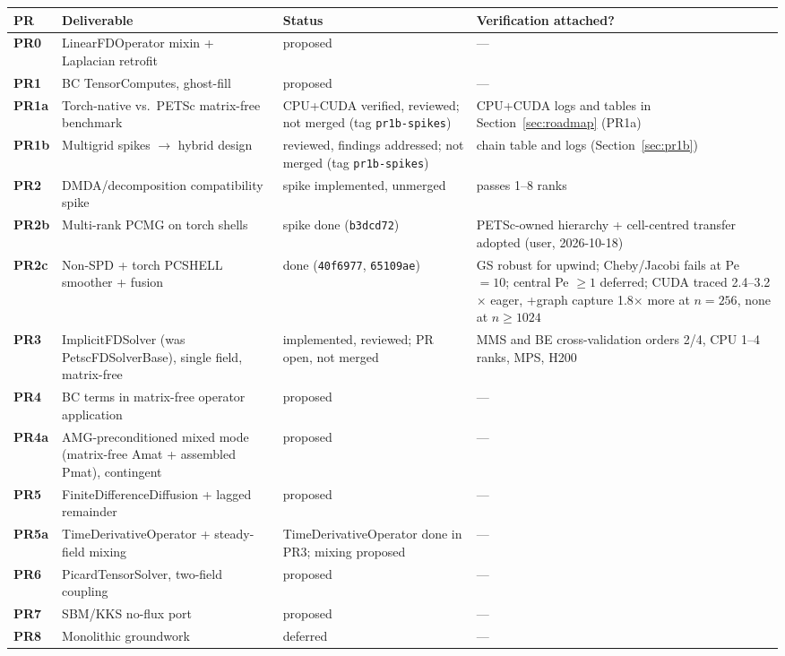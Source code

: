 \documentclass[11pt]{article}
\begin{document}
\begin{longtable}{>{\bfseries}p{} p{} p{} p{}}
\toprule
PR & Deliverable & Status & Verification attached? \\
\midrule
\endhead
PR0 & LinearFDOperator mixin + Laplacian retrofit & proposed & --- \\
PR1 & BC TensorComputes, ghost-fill & proposed & --- \\
PR1a & Torch-native vs.\ PETSc matrix-free benchmark & CPU+CUDA verified, reviewed; not merged (tag \texttt{pr1b-spikes}) & CPU+CUDA logs and tables in Section~\ref{sec:roadmap} (PR1a) \\
PR1b & Multigrid spikes $\to$ hybrid design & reviewed, findings addressed; not merged (tag \texttt{pr1b-spikes}) & chain table and logs (Section~\ref{sec:pr1b}) \\
PR2 & DMDA/decomposition compatibility spike & spike implemented, unmerged & passes 1--8 ranks \\
PR2b & Multi-rank PCMG on torch shells & spike done (\texttt{b3dcd72}) & PETSc-owned hierarchy + cell-centred transfer adopted (user, 2026-10-18) \\
PR2c & Non-SPD + torch PCSHELL smoother + fusion & done (\texttt{40f6977}, \texttt{65109ae}) & GS robust for upwind; Cheby/Jacobi fails at Pe $=10$; central Pe $\ge1$ deferred; CUDA traced 2.4--3.2$\times$ eager, +graph capture 1.8$\times$ more at $n=256$, none at $n\ge1024$ \\
PR3 & ImplicitFDSolver (was PetscFDSolverBase), single field, matrix-free & implemented, reviewed; PR open, not merged & MMS and BE cross-validation orders 2/4, CPU 1--4 ranks, MPS, H200 \\
PR4 & BC terms in matrix-free operator application & proposed & --- \\
PR4a & AMG-preconditioned mixed mode (matrix-free Amat + assembled Pmat), contingent & proposed & --- \\
PR5 & FiniteDifferenceDiffusion + lagged remainder & proposed & --- \\
PR5a & TimeDerivativeOperator + steady-field mixing & TimeDerivativeOperator done in PR3; mixing proposed & --- \\
PR6 & PicardTensorSolver, two-field coupling & proposed & --- \\
PR7 & SBM/KKS no-flux port & proposed & --- \\
PR8 & Monolithic groundwork & deferred & --- \\
\bottomrule
\end{longtable}
\end{document}
